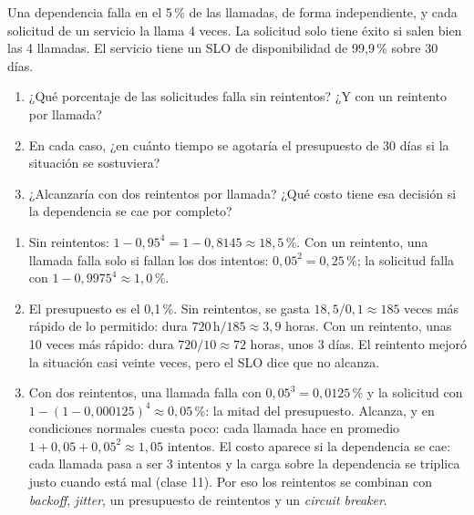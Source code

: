 \documentclass[variant=guia,cover=institutional,mode=screen]{ua-engineering-v6-article}
\begin{document}
\begin{uaexercise}
Una dependencia falla en el 5\,\% de las llamadas, de forma independiente, y cada solicitud de un servicio la llama 4 veces. La solicitud solo tiene éxito si salen bien las 4 llamadas. El servicio tiene un SLO de disponibilidad de 99,9\,\% sobre 30 días.
\begin{enumerate}
\item ¿Qué porcentaje de las solicitudes falla sin reintentos? ¿Y con un reintento por llamada?
\item En cada caso, ¿en cuánto tiempo se agotaría el presupuesto de 30 días si la situación se sostuviera?
\item ¿Alcanzaría con dos reintentos por llamada? ¿Qué costo tiene esa decisión si la dependencia se cae por completo?
\end{enumerate}
\end{uaexercise}
\begin{uaanswer}
\begin{enumerate}
\item Sin reintentos: $1 - 0{,}95^4 = 1 - 0{,}8145 \approx 18{,}5\,\%$. Con un reintento, una llamada falla solo si fallan los dos intentos: $0{,}05^2 = 0{,}25\,\%$; la solicitud falla con $1 - 0{,}9975^4 \approx 1{,}0\,\%$.
\item El presupuesto es el 0,1\,\%. Sin reintentos, se gasta $18{,}5 / 0{,}1 \approx 185$ veces más rápido de lo permitido: dura $720\,\text{h} / 185 \approx 3{,}9$ horas. Con un reintento, unas 10 veces más rápido: dura $720 / 10 \approx 72$ horas, unos 3 días. El reintento mejoró la situación casi veinte veces, pero el SLO dice que no alcanza.
\item Con dos reintentos, una llamada falla con $0{,}05^3 = 0{,}0125\,\%$ y la solicitud con $1 - (1 - 0{,}000125)^4 \approx 0{,}05\,\%$: la mitad del presupuesto. Alcanza, y en condiciones normales cuesta poco: cada llamada hace en promedio $1 + 0{,}05 + 0{,}05^2 \approx 1{,}05$ intentos. El costo aparece si la dependencia se cae: cada llamada pasa a ser 3 intentos y la carga sobre la dependencia se triplica justo cuando está mal (clase 11). Por eso los reintentos se combinan con \emph{backoff}, \emph{jitter}, un presupuesto de reintentos y un \emph{circuit breaker}.
\end{enumerate}
\end{uaanswer}
\end{document}

